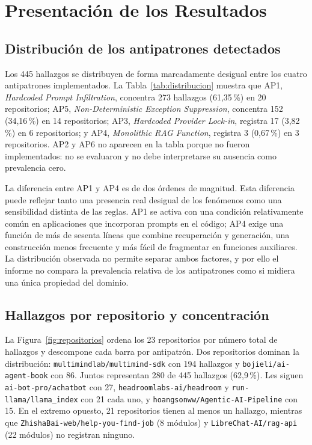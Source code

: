 \section{Presentación de los Resultados}

\subsection{Distribución de los antipatrones detectados}

Los 445 hallazgos se distribuyen de forma marcadamente desigual entre los cuatro antipatrones implementados. La Tabla~\ref{tab:distribucion} muestra que AP1, \emph{Hardcoded Prompt Infiltration}, concentra 273 hallazgos (61,35\,\%) en 20 repositorios; AP5, \emph{Non-Deterministic Exception Suppression}, concentra 152 (34,16\,\%) en 14 repositorios; AP3, \emph{Hardcoded Provider Lock-in}, registra 17 (3,82\,\%) en 6 repositorios; y AP4, \emph{Monolithic RAG Function}, registra 3 (0,67\,\%) en 3 repositorios. AP2 y AP6 no aparecen en la tabla porque no fueron implementados: no se evaluaron y no debe interpretarse su ausencia como prevalencia cero.



La diferencia entre AP1 y AP4 es de dos órdenes de magnitud. Esta diferencia puede reflejar tanto una presencia real desigual de los fenómenos como una sensibilidad distinta de las reglas. AP1 se activa con una condición relativamente común en aplicaciones que incorporan prompts en el código; AP4 exige una función de más de sesenta líneas que combine recuperación y generación, una construcción menos frecuente y más fácil de fragmentar en funciones auxiliares. La distribución observada no permite separar ambos factores, y por ello el informe no compara la prevalencia relativa de los antipatrones como si midiera una única propiedad del dominio.

\subsection{Hallazgos por repositorio y concentración}

La Figura~\ref{fig:repositorios} ordena los 23 repositorios por número total de hallazgos y descompone cada barra por antipatrón. Dos repositorios dominan la distribución: \texttt{multimindlab/multimind-sdk} con 194 hallazgos y \texttt{bojieli/ai-agent-book} con 86. Juntos representan 280 de 445 hallazgos (62,9\,\%). Les siguen \texttt{ai-bot-pro/achatbot} con 27, \texttt{headroomlabs-ai/headroom} y \texttt{run-llama/llama\_index} con 21 cada uno, y \texttt{hoangsonww/Agentic-AI-Pipeline} con 15. En el extremo opuesto, 21 repositorios tienen al menos un hallazgo, mientras que \texttt{ZhishaBai-web/help-you-find-job} (8 módulos) y \texttt{LibreChat-AI/rag-api} (22 módulos) no registran ninguno.


